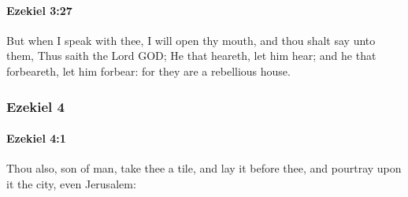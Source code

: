 		\paragraph{Ezekiel 3:27} %
			\label{EZEKIEL-3-27}

			But when I speak with thee, I will open thy mouth, and thou shalt say unto them, Thus saith the Lord GOD; He that heareth, let him hear; and he that forbeareth, let him forbear: for they are a rebellious house.

	\subsubsection{Ezekiel 4} %
		\label{EZEKIEL-4}

		\paragraph{Ezekiel 4:1} %
			\label{EZEKIEL-4-1}

			Thou also, son of man, take thee a tile, and lay it before thee, and pourtray upon it the city, even Jerusalem:

